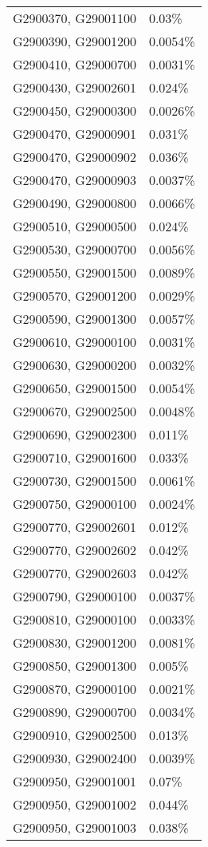 \begin{longtable}[]{@{}ll@{}}
G2900370, G29001100 & 0.03\% \\
G2900390, G29001200 & 0.0054\% \\
G2900410, G29000700 & 0.0031\% \\
G2900430, G29002601 & 0.024\% \\
G2900450, G29000300 & 0.0026\% \\
G2900470, G29000901 & 0.031\% \\
G2900470, G29000902 & 0.036\% \\
G2900470, G29000903 & 0.0037\% \\
G2900490, G29000800 & 0.0066\% \\
G2900510, G29000500 & 0.024\% \\
G2900530, G29000700 & 0.0056\% \\
G2900550, G29001500 & 0.0089\% \\
G2900570, G29001200 & 0.0029\% \\
G2900590, G29001300 & 0.0057\% \\
G2900610, G29000100 & 0.0031\% \\
G2900630, G29000200 & 0.0032\% \\
G2900650, G29001500 & 0.0054\% \\
G2900670, G29002500 & 0.0048\% \\
G2900690, G29002300 & 0.011\% \\
G2900710, G29001600 & 0.033\% \\
G2900730, G29001500 & 0.0061\% \\
G2900750, G29000100 & 0.0024\% \\
G2900770, G29002601 & 0.012\% \\
G2900770, G29002602 & 0.042\% \\
G2900770, G29002603 & 0.042\% \\
G2900790, G29000100 & 0.0037\% \\
G2900810, G29000100 & 0.0033\% \\
G2900830, G29001200 & 0.0081\% \\
G2900850, G29001300 & 0.005\% \\
G2900870, G29000100 & 0.0021\% \\
G2900890, G29000700 & 0.0034\% \\
G2900910, G29002500 & 0.013\% \\
G2900930, G29002400 & 0.0039\% \\
G2900950, G29001001 & 0.07\% \\
G2900950, G29001002 & 0.044\% \\
G2900950, G29001003 & 0.038\% \\

\end{longtable}
